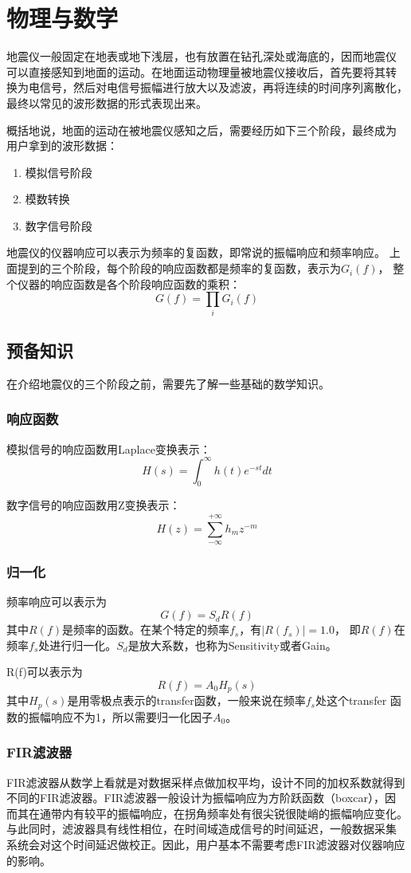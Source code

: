 \section{物理与数学}
地震仪一般固定在地表或地下浅层，也有放置在钻孔深处或海底的，因而地震仪
可以直接感知到地面的运动。在地面运动物理量被地震仪接收后，首先要将其转
换为电信号，然后对电信号振幅进行放大以及滤波，再将连续的时间序列离散化，
最终以常见的波形数据的形式表现出来。

概括地说，地面的运动在被地震仪感知之后，需要经历如下三个阶段，最终成为
用户拿到的波形数据：
\begin{enumerate}
\item 模拟信号阶段
\item 模数转换
\item 数字信号阶段
\end{enumerate}

地震仪的仪器响应可以表示为频率的复函数，即常说的振幅响应和频率响应。
上面提到的三个阶段，每个阶段的响应函数都是频率的复函数，表示为$G_i(f)$，
整个仪器的响应函数是各个阶段响应函数的乘积：
\[
    G(f)=\prod_i G_i(f)
\]

\subsection{预备知识}
在介绍地震仪的三个阶段之前，需要先了解一些基础的数学知识。
\subsubsection{响应函数}
模拟信号的响应函数用Laplace变换表示：
\[
    H(s)=\int_0^{\infty}h(t)e^{-st}dt
\]

数字信号的响应函数用Z变换表示：
\[
    H(z)=\sum_{-\infty}^{+\infty}h_m z^{-m}
\]

\subsubsection{归一化}
频率响应可以表示为
\[
    G(f)=S_d R(f)
\]
其中$R(f)$是频率的函数。在某个特定的频率$f_s$，有$|R(f_s)|=1.0$，
即$R(f)$在频率$f_s$处进行归一化。$S_d$是放大系数，也称为Sensitivity或者Gain。

R(f)可以表示为
\[
    R(f)= A_0 H_p(s)
\]
其中$H_p(s)$是用零极点表示的transfer函数，一般来说在频率$f_s$处这个transfer
函数的振幅响应不为1，所以需要归一化因子$A_0$。

\subsubsection{FIR滤波器}
FIR滤波器从数学上看就是对数据采样点做加权平均，设计不同的加权系数就得到
不同的FIR滤波器。FIR滤波器一般设计为振幅响应为方阶跃函数（boxcar），因
而其在通带内有较平的振幅响应，在拐角频率处有很尖锐很陡峭的振幅响应变化。
与此同时，滤波器具有线性相位，在时间域造成信号的时间延迟，一般数据采集
系统会对这个时间延迟做校正。因此，用户基本不需要考虑FIR滤波器对仪器响应的影响。

